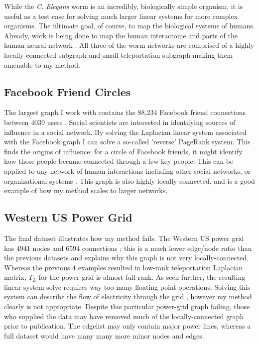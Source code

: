 \documentclass{article}
\begin{document}
While the \textit{C. Elegans} worm is an incredibly, biologically simple organism, it is useful as a test case for solving much larger linear systems for more complex organisms. The ultimate goal, of course, to map the biological systems of humans. Already, work is being done to map the human interactome \cite{Rual:2005,Rolland:2014} and parts of the human neural network \cite{Toga:2012}. All three of the worm networks are comprised of a highly locally-connected subgraph and small teleportation subgraph making them amenable to my method. 

\subsection{Facebook Friend Circles}
The largest graph I work with contains the 88,234 Facebook friend connections between 4039 users  \cite{Mcauley:2012}. Social scientists are interested in identifying sources of influence in a social network. By solving the Laplacian linear system associated with the Facebook graph I can solve a so-called 'reverse' PageRank system. This finds the origins of influence; for a circle of Facebook friends, it might identify how those people became connected through a few key people. This can be applied to any network of human interactions including other social networks, or organizational systems \cite{Gleich:2015}. This graph is also highly locally-connected, and is a good example of how my method scales to larger networks.


\subsection{Western US Power Grid}
The final dataset illustrates how my method fails. The Western US power grid has 4941 nodes and 6594 connections \cite{Watts:1998}; this is a much lower edge/node ratio than the previous datasets and explains why this graph is not very locally-connected. Whereas the previous 4 examples resulted in low-rank teleportation Laplacian matrix, $T_L$ for the power grid is almost full-rank. As seen further, the resulting linear system solve requires way too many floating point operations. Solving this system can describe the flow of electricity through the grid \cite{Pagani:2013}, however my method clearly is not appropriate. Despite this particular power-grid graph failing, those who supplied the data may have removed much of the locally-connected graph prior to publication. The edgelist may only contain major power lines, whereas a full dataset would have many many more minor nodes and edges.
\end{document}
